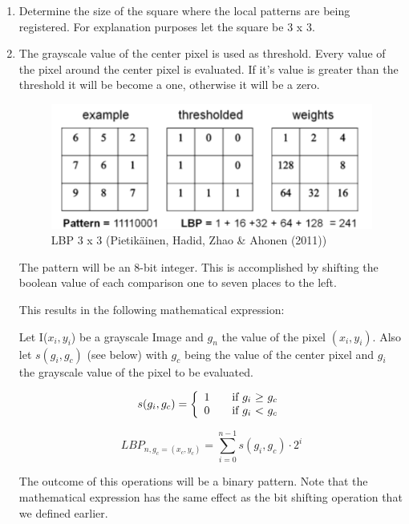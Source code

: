 \documentclass[a4paper]{article}
\begin{document}
\begin{enumerate}

\item Determine the size of the square where the local patterns are being
registered. For explanation purposes let the square be 3 x 3. \\
\item The grayscale value of the center pixel is used as threshold. Every value
of the pixel around the center pixel is evaluated. If it's value is greater
than the threshold it will be become a one, otherwise it will be a zero.

\begin{figure}[H]
    \center
    \includegraphics[scale=0.5]{lbp.png}
    \caption{LBP 3 x 3 (Pietik\"ainen, Hadid, Zhao \& Ahonen (2011))}
\end{figure}

The pattern will be an 8-bit integer. This is accomplished by shifting the
boolean value of each comparison one to seven places to the left.

This results in the following mathematical expression:

Let I($x_i, y_i$) be a grayscale Image and $g_n$ the value of the pixel $(x_i,
y_i)$. Also let $s(g_i, g_c)$ (see below) with $g_c$ being the value of the
center pixel and $g_i$ the grayscale value of the pixel to be evaluated.

$$
    s(g_i, g_c) = \left \{
    \begin{array}{l l}
        1 & \quad \text{if $g_i$ $\geq$ $g_c$}\\
        0 & \quad \text{if $g_i$ $<$ $g_c$}\\
    \end{array} \right.
$$

$$LBP_{n, g_c = (x_c, y_c)} = \sum\limits_{i=0}^{n-1} s(g_i, g_c) \cdot 2^i$$

The outcome of this operations will be a binary pattern. Note that the
mathematical expression has the same effect as the bit shifting operation that
we defined earlier.


\end{enumerate}
\end{document}
